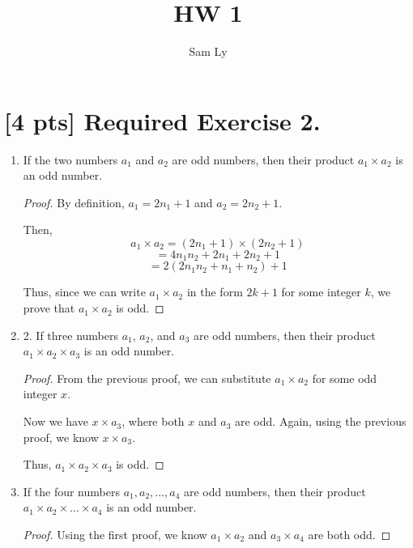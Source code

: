 \documentclass{article}
\title{HW 1}
\author{Sam Ly}
\begin{document}
\maketitle

\section*{[4 pts] Required Exercise 2.}

\begin{enumerate}
    \item {
        If the two numbers \(a_1\) and \(a_2\) are odd numbers,
        then their product \(a_1 \times a_2\) is an odd number.

        \begin{proof}
            By definition, \(a_1 = 2n_1 + 1\) and \(a_2 = 2n_2 + 1\).

            Then, 
            \[ a_1 \times a_2 = (2n_1 + 1) \times (2n_2 + 1)\]
            \[ = 4n_1n_2 + 2n_1 + 2n_2 + 1\]
            \[ = 2(2n_1n_2 + n_1 + n_2) + 1 \]

            Thus, since we can write \(a_1 \times a_2 \) in the form \(2k + 1 \) for some
            integer \(k\), we prove that \(a_1 \times a_2 \) is odd.
        \end{proof}
    }

    \item {
        2. If three numbers $a_1$, $a_2$, and $a_3$ are odd numbers, then their product 
        \(a_1 \times a_2 \times a_3 \) is an odd number.

        \begin{proof}
            From the previous proof, we can substitute \(a_1 \times a_2 \) for 
            some odd integer \(x\).

            Now we have \(x \times a_3\), where both \(x\) and \(a_3\) are odd.
            Again, using the previous proof, we know \(x \times a_3\).

            Thus, \(a_1 \times a_2 \times a_3 \) is odd.
        \end{proof}
    }

    \item {
        If the four numbers \(a_1, a_2, ..., a_4 \)
        are odd numbers, then their product \(a_1 \times a_2 \times ... \times a_4\)
        is an odd number.

        \begin{proof}
            Using the first proof, we know \(a_1 \times a_2 \)  and \(a_3 \times a_4\) 
            are both odd.


\end{proof}}
\end{enumerate}
\end{document}
